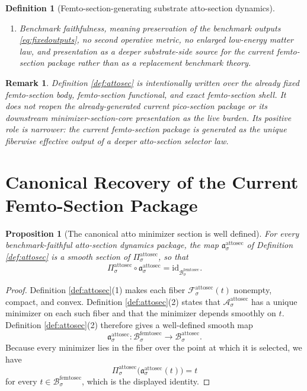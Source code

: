 \documentclass[11pt]{article}
\newcommand{\FemtoSectionBody}[1]{\mathcal B_{#1}^{\mathrm{femtosec}}}
\newcommand{\FemtoSectionShell}[1]{\mathcal Z_{#1}^{\mathrm{femtosec}}}
\newcommand{\AttoSectionBody}[1]{\mathcal B_{#1}^{\mathrm{attosec}}}
\newcommand{\AttoSectionProj}[1]{\Pi_{#1}^{\mathrm{attosec}}}
\newcommand{\AttoSectionFiber}[2]{\mathcal F_{#1}^{\mathrm{attosec}}(#2)}
\newcommand{\AttoSectionFemtoMin}[1]{\mathfrak a_{#1}^{\mathrm{attosec}}}
\newcommand{\AttoSectionFunctional}[1]{\mathscr A_{#1}^{\mathrm{attosec}}}
\newcommand{\AttoSectionShell}[1]{\mathcal Z_{#1}^{\mathrm{attosec}}}
\newtheorem{definition}{Definition}
\newtheorem{proposition}{Proposition}
\newtheorem{remark}{Remark}
\begin{document}
\begin{definition}[Femto-section-generating substrate atto-section dynamics]
\begin{enumerate}
\[\begin{array}{l}
    \AttoSectionFunctional{\sigma}(v)
    =
    \displaystyle\min_{w\in\AttoSectionFiber{\sigma}{\AttoSectionProj{\sigma}(v)}}
    \AttoSectionFunctional{\sigma}(w)
    \end{array}
    \right\},
    \]
    and
    \[
    \AttoSectionProj{\sigma}\big|_{\AttoSectionShell{\sigma}}
    :
    \AttoSectionShell{\sigma}
    \xrightarrow{\cong}
    \FemtoSectionShell{\sigma}
    \]
    is a diffeomorphism.
    \item Benchmark faithfulness, meaning preservation of the benchmark outputs \eqref{eq:fixedoutputs}, no second operative metric, no enlarged low-energy matter law, and presentation as a deeper substrate-side source for the current femto-section package rather than as a replacement benchmark theory.
\end{enumerate}
\end{definition}

\begin{remark}
Definition \ref{def:attosec} is intentionally written over the already fixed femto-section body, femto-section functional, and exact femto-section shell. It does not reopen the already-generated current pico-section package or its downstream minimizer-section-core presentation as the live burden. Its positive role is narrower: the current femto-section package is generated as the unique fiberwise effective output of a deeper atto-section selector law.
\end{remark}

\section{Canonical Recovery of the Current Femto-Section Package}

\begin{proposition}[The canonical atto minimizer section is well defined]
\label{prop:section}
For every benchmark-faithful atto-section dynamics package, the map \(\AttoSectionFemtoMin{\sigma}\) of Definition \ref{def:attosec} is a smooth section of \(\AttoSectionProj{\sigma}\), so that
\[
\AttoSectionProj{\sigma}\circ\AttoSectionFemtoMin{\sigma}
=
\mathrm{id}_{\FemtoSectionBody{\sigma}}.
\]
\end{proposition}

\begin{proof}
Definition \ref{def:attosec}(1) makes each fiber \(\AttoSectionFiber{\sigma}{t}\) nonempty, compact, and convex. Definition \ref{def:attosec}(2) states that \(\AttoSectionFunctional{\sigma}\) has a unique minimizer on each such fiber and that the minimizer depends smoothly on \(t\). Definition \ref{def:attosec}(2) therefore gives a well-defined smooth map
\[
\AttoSectionFemtoMin{\sigma}:\FemtoSectionBody{\sigma}\to\AttoSectionBody{\sigma}.
\]
Because every minimizer lies in the fiber over the point at which it is selected, we have
\[
\AttoSectionProj{\sigma}\bigl(\AttoSectionFemtoMin{\sigma}(t)\bigr)=t
\]
for every \(t\in\FemtoSectionBody{\sigma}\), which is the displayed identity.
\end{proof}
\end{document}
